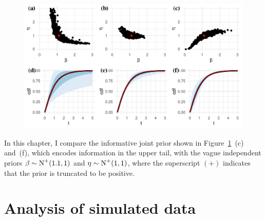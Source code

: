 \begin{figure}
    \centering
    \includegraphics[width=1\textwidth, draft]{./figures/ch-2/joint-priors.pdf}
    \caption{}
    \label{fig:kaminskiy-join-priors}
\end{figure}

In this chapter, I compare the informative joint prior shown in Figure~\ref{fig:kaminskiy-join-priors}~(c) and~(f), which encodes information in the upper tail, with the vague independent priors $\beta \sim \hbox{N}^{+}(1.1, 1)$ and $\eta \sim \hbox{N}^{+}(1, 1)$, where the superscript $(+)$ indicates that the prior is truncated to be positive. 

\section{Analysis of simulated data}


